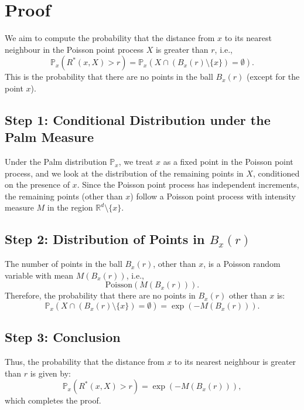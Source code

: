 \documentclass{article}
\begin{document}
\section*{Proof}
We aim to compute the probability that the distance from \( x \) to its nearest neighbour in the Poisson point process \( X \) is greater than \( r \), i.e., 
\[
\mathbb{P}_x(R^*(x, X) > r) = \mathbb{P}_x\left(X \cap (B_x(r) \setminus \{x\}) = \emptyset\right).
\]
This is the probability that there are no points in the ball \( B_x(r) \) (except for the point \( x \)).

\subsection*{Step 1: Conditional Distribution under the Palm Measure}
Under the Palm distribution \( \mathbb{P}_x \), we treat \( x \) as a fixed point in the Poisson point process, and we look at the distribution of the remaining points in \( X \), conditioned on the presence of \( x \).
Since the Poisson point process has independent increments, the remaining points (other than \( x \)) follow a Poisson point process with intensity measure \( M \) in the region \( \mathbb{R}^d \setminus \{x\} \).

\subsection*{Step 2: Distribution of Points in \( B_x(r) \)}
The number of points in the ball \( B_x(r) \), other than \( x \), is a Poisson random variable with mean \( M(B_x(r)) \), i.e.,
\[
\text{Poisson}(M(B_x(r))).
\]
Therefore, the probability that there are no points in \( B_x(r) \) other than \( x \) is:
\[
\mathbb{P}_x\left( X \cap (B_x(r) \setminus \{x\}) = \emptyset \right) = \exp\left(-M(B_x(r))\right).
\]

\subsection*{Step 3: Conclusion}
Thus, the probability that the distance from \( x \) to its nearest neighbour is greater than \( r \) is given by:
\[
\mathbb{P}_x(R^*(x, X) > r) = \exp\left(-M(B_x(r))\right),
\]
which completes the proof.
\end{document}
